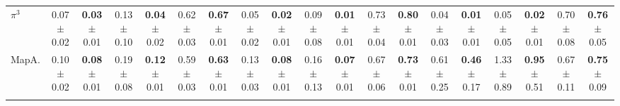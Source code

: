 \begin{table}[ht]
{\begin{tabular}{l *{3}{cc} *{3}{cc} *{3}{cc}}
$\pi^3$ 
& \makecell{0.07 \\ {\tiny $\pm$ 0.02}} & \makecell{\textbf{0.03} \\ {\tiny $\pm$ 0.01}} 
& \makecell{0.13 \\ {\tiny $\pm$ 0.10}} & \makecell{\textbf{0.04} \\ {\tiny $\pm$ 0.02}} 
& \makecell{0.62 \\ {\tiny $\pm$ 0.03}} & \makecell{\textbf{0.67} \\ {\tiny $\pm$ 0.01}} 
& \makecell{0.05 \\ {\tiny $\pm$ 0.02}} & \makecell{\textbf{0.02} \\ {\tiny $\pm$ 0.01}} 
& \makecell{0.09 \\ {\tiny $\pm$ 0.08}} & \makecell{\textbf{0.01} \\ {\tiny $\pm$ 0.01}} 
& \makecell{0.73 \\ {\tiny $\pm$ 0.04}} & \makecell{\textbf{0.80} \\ {\tiny $\pm$ 0.01}} 
& \makecell{0.04 \\ {\tiny $\pm$ 0.03}} & \makecell{\textbf{0.01} \\ {\tiny $\pm$ 0.01}} 
& \makecell{0.05 \\ {\tiny $\pm$ 0.05}} & \makecell{\textbf{0.02} \\ {\tiny $\pm$ 0.01}} 
& \makecell{0.70 \\ {\tiny $\pm$ 0.08}} & \makecell{\textbf{0.76} \\ {\tiny $\pm$ 0.05}} \\
\addlinespace[3pt]

MapA.
& \makecell{0.10 \\ {\tiny $\pm$ 0.02}} & \makecell{\textbf{0.08} \\ {\tiny $\pm$ 0.01}} 
& \makecell{0.19 \\ {\tiny $\pm$ 0.08}} & \makecell{\textbf{0.12} \\ {\tiny $\pm$ 0.01}} 
& \makecell{0.59 \\ {\tiny $\pm$ 0.03}} & \makecell{\textbf{0.63} \\ {\tiny $\pm$ 0.01}} 
& \makecell{0.13 \\ {\tiny $\pm$ 0.03}} & \makecell{\textbf{0.08} \\ {\tiny $\pm$ 0.01}} 
& \makecell{0.16 \\ {\tiny $\pm$ 0.13}} & \makecell{\textbf{0.07} \\ {\tiny $\pm$ 0.01}} 
& \makecell{0.67 \\ {\tiny $\pm$ 0.06}} & \makecell{\textbf{0.73} \\ {\tiny $\pm$ 0.01}} 
& \makecell{0.61 \\ {\tiny $\pm$ 0.25}} & \makecell{\textbf{0.46} \\ {\tiny $\pm$ 0.17}} 
& \makecell{1.33 \\ {\tiny $\pm$ 0.89}} & \makecell{\textbf{0.95} \\ {\tiny $\pm$ 0.51}} 
& \makecell{0.67 \\ {\tiny $\pm$ 0.11}} & \makecell{\textbf{0.75} \\ {\tiny $\pm$ 0.09}} \\
\addlinespace[3pt]


\end{tabular}}
\end{table}
